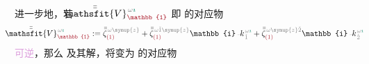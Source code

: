 进一步地，若 $\xint{\mathcolor{gray}{-}}{25}{\bar{\bar{\mathsfit{V}}}}^{\;\! \mathcolor{gray}{\omega} \textcolor{PineGreen}{\imath}}_{\textcolor{Maroon}{\mathbb{1}}}$ 
即  的对应物
\begin{align} \label{eq:plane_wave_basis-V1}
	\xint{\mathcolor{gray}{-}}{25}{\bar{\bar{\mathsfit{V}}}}^{\;\! \mathcolor{gray}{\omega} \textcolor{PineGreen}{\imath}}_{\textcolor{Maroon}{\mathbb{1}}} := \bar{\bar{\zeta}}^{\;\! \mathcolor{gray}{\omega} \mathcolor{gray}{\symup{z}}}_{\textcolor{Maroon}{(1)}} + \bar{\bar{\zeta}}^{\;\! \mathcolor{gray}{\omega} \mathcolor{gray}{\check{1} \symup{z}}}_{\textcolor{Maroon}{(1)}} \mathbb{i} \xint{\begin{smallmatrix} ~ \\ {}^{}_{\mathcolor{gray}{-}} \\ ~ \end{smallmatrix}}{15}{k}_{\;\! \mathcolor{gray}{\check{1}}}^{\;\! \mathcolor{gray}{\omega} \textcolor{PineGreen}{\imath}} + \bar{\bar{\zeta}}^{\;\! \mathcolor{gray}{\omega} \mathcolor{gray}{\symup{z} \check{2}}}_{\textcolor{Maroon}{(1)}} \mathbb{i} \xint{\begin{smallmatrix} ~ \\ {}^{}_{\mathcolor{gray}{-}} \\ ~ \end{smallmatrix}}{15}{k}_{\;\! \mathcolor{gray}{\check{2}}}^{\;\! \mathcolor{gray}{\omega} \textcolor{PineGreen}{\imath}}
\end{align}
\textcolor{Plum}{可逆}，那么  及其解，将变为  的对应物
